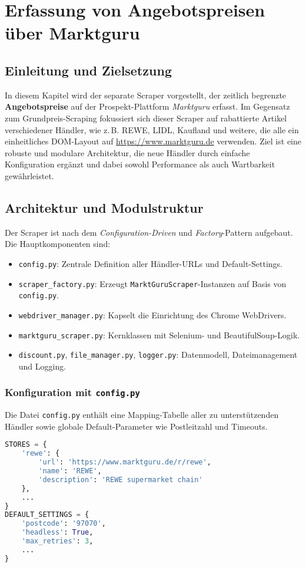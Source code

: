 \chapter{Erfassung von Angebotspreisen über Marktguru}
\renewcommand{\authorinitials}{DH}
\label{chap:marktguru_scraping}

\section{Einleitung und Zielsetzung}
In diesem Kapitel wird der separate Scraper vorgestellt, der zeitlich begrenzte \textbf{Angebotspreise} auf der Prospekt-Plattform \textit{Marktguru} erfasst. Im Gegensatz zum Grundpreis-Scraping fokussiert sich dieser Scraper auf rabattierte Artikel verschiedener Händler, wie z.\,B. REWE, LIDL, Kaufland und weitere, die alle ein einheitliches DOM-Layout auf \url{https://www.marktguru.de} verwenden. Ziel ist eine robuste und modulare Architektur, die neue Händler durch einfache Konfiguration ergänzt und dabei sowohl Performance als auch Wartbarkeit gewährleistet.

\section{Architektur und Modulstruktur}
Der Scraper ist nach dem \emph{Configuration-Driven} und \emph{Factory}-Pattern aufgebaut. Die Hauptkomponenten sind:
\begin{itemize}
  \item \texttt{config.py}: Zentrale Definition aller Händler-URLs und Default-Settings.  
  \item \texttt{scraper\_factory.py}: Erzeugt \texttt{MarktGuruScraper}-Instanzen auf Basis von \texttt{config.py}.  
  \item \texttt{webdriver\_manager.py}: Kapselt die Einrichtung des Chrome WebDrivers.  
  \item \texttt{marktguru\_scraper.py}: Kernklassen mit Selenium- und BeautifulSoup-Logik.  
  \item \texttt{discount.py}, \texttt{file\_manager.py}, \texttt{logger.py}: Datenmodell, Dateimanagement und Logging.  
\end{itemize}

\subsection{Konfiguration mit \texttt{config.py}}
Die Datei \texttt{config.py} enthält eine Mapping-Tabelle aller zu unterstützenden Händler sowie globale Default-Parameter wie Postleitzahl und Timeouts.
\begin{lstlisting}[language=Python, caption={Auszug aus \texttt{config.py}}]
STORES = {
    'rewe': {
        'url': 'https://www.marktguru.de/r/rewe',
        'name': 'REWE',
        'description': 'REWE supermarket chain'
    },
    ...
}
DEFAULT_SETTINGS = {
    'postcode': '97070',
    'headless': True,
    'max_retries': 3,
    ...
}
\end{lstlisting}

